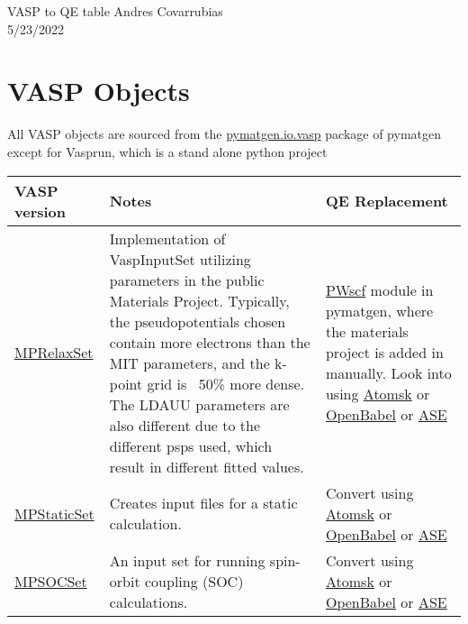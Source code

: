 \documentclass[12pt]{article}
\begin{document}
\noindent VASP to QE table \hfill Andres Covarrubias    \\
5/23/2022

\hrulefill

\section*{VASP Objects}
All VASP objects are sourced from the \href{https://pymatgen.org/pymatgen.io.vasp.html?highlight=io\%20vasp\#module-pymatgen.io.vasp}{pymatgen.io.vasp} package of pymatgen except for Vasprun, which is a stand alone python project
\begin{center}
\begin{table}[ht]
\begin{tabularx}{\linewidth}{|>{\RaggedRight}p{2.5cm}|x|x|}\hline
 VASP version & Notes & QE Replacement \\ \hline
 
 \href{https://pymatgen.org/pymatgen.io.vasp.sets.html?highlight=mprelaxset#pymatgen.io.vasp.sets.MPRelaxSet}{MPRelaxSet} & 
 Implementation of VaspInputSet utilizing parameters in the public Materials Project. Typically, the pseudopotentials chosen contain more electrons than the MIT parameters, and the k-point grid is ~50\% more dense. The LDAUU parameters are also different due to the different psps used, which result in different fitted values. & 
 \href{https://pymatgen.org/pymatgen.io.pwscf.html}{PWscf} module in pymatgen, where the materials project is added in manually. Look into using \href{https://atomsk.univ-lille.fr/}{Atomsk} or \href{http://openbabel.org/wiki/Main_Page}{OpenBabel} or \href{https://wiki.fysik.dtu.dk/ase/}{ASE} \\ \hline
 
 \href{https://pymatgen.org/pymatgen.io.vasp.sets.html?highlight=mpstaticset#pymatgen.io.vasp.sets.MPStaticSet}{MPStaticSet} &
Creates input files for a static calculation. &
 Convert using \href{https://atomsk.univ-lille.fr/}{Atomsk} or \href{http://openbabel.org/wiki/Main_Page}{OpenBabel} or \href{https://wiki.fysik.dtu.dk/ase/}{ASE} \\ \hline
 
 \href{https://pymatgen.org/pymatgen.io.vasp.sets.html?highlight=mpsocset#pymatgen.io.vasp.sets.MPSOCSet}{MPSOCSet} &
 An input set for running spin-orbit coupling (SOC) calculations. &
 Convert using \href{https://atomsk.univ-lille.fr/}{Atomsk} or \href{http://openbabel.org/wiki/Main_Page}{OpenBabel} or \href{https://wiki.fysik.dtu.dk/ase/}{ASE} \\ \hline
 

\end{tabularx}
\end{table}
\end{center}
\end{document}
